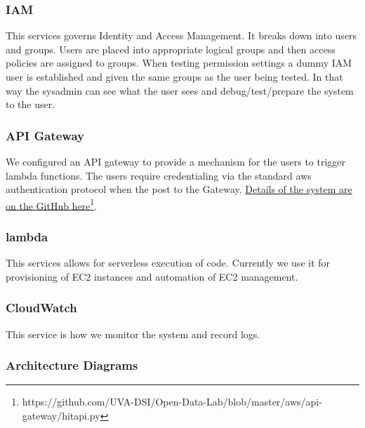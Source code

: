 \subsubsection{IAM}
This services governs Identity and Access Management. It breaks down into users and groups. Users are placed into appropriate logical groups and then access policies are assigned to groups.
When testing permission settings a dummy IAM user is established and given the same groups as the user being tested. In that way the sysadmin can see what the user sees and debug/test/prepare the system to the user.
\subsubsection{API Gateway}
We configured an API gateway to provide a mechanism for the users to trigger lambda functions. The users require credentialing via the standard aws authentication protocol when the post to the Gateway. \href{https://github.com/UVA-DSI/Open-Data-Lab/blob/master/aws/api-gateway/hitapi.py}{Details of the system are on the GitHub here\footnote{\url{https://github.com/UVA-DSI/Open-Data-Lab/blob/master/aws/api-gateway/hitapi.py}}}.



\subsubsection{lambda}
This services allows for serverless execution of code. Currently we use it for provisioning of EC2 instances and automation of EC2 management.


\subsubsection{CloudWatch}
This service is how we monitor the system and record logs.

\subsubsection{Architecture Diagrams}


